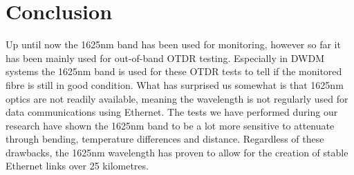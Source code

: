 \documentclass{article}
\begin{document}


\newpage
\section{Conclusion}
Up until now the 1625nm band has been used for monitoring, however so far it has been mainly used for out-of-band OTDR testing.
Especially in DWDM systems the 1625nm band is used for these OTDR tests to tell if the monitored fibre is still in good condition.
What has surprised us somewhat is that 1625nm optics are not readily available, meaning the wavelength is not regularly used for data communications using Ethernet.
The tests we have performed during our research have shown the 1625nm band to be a lot more sensitive to attenuate through bending, temperature differences and distance.
Regardless of these drawbacks, the 1625nm wavelength has proven to allow for the creation of stable Ethernet links over 25 kilometres.

\newpage


\end{document}
